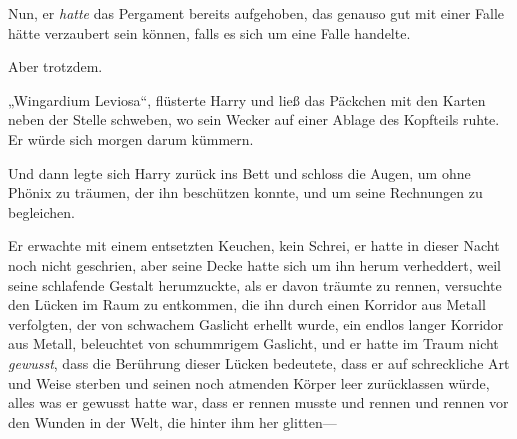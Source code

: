 Nun, er \emph{hatte} das Pergament bereits aufgehoben, das genauso gut mit einer Falle hätte verzaubert sein können, falls es sich um eine Falle handelte.

Aber trotzdem.

„Wingardium Leviosa“, flüsterte Harry und ließ das Päckchen mit den Karten neben der Stelle schweben, wo sein Wecker auf einer Ablage des Kopfteils ruhte. Er würde sich morgen darum kümmern.

Und dann legte sich Harry zurück ins Bett und schloss die Augen, um ohne Phönix zu träumen, der ihn beschützen konnte, und um seine Rechnungen zu begleichen.

\later

Er erwachte mit einem entsetzten Keuchen, kein Schrei, er hatte in dieser Nacht noch nicht geschrien, aber seine Decke hatte sich um ihn herum verheddert, weil seine schlafende Gestalt herumzuckte, als er davon träumte zu rennen, versuchte den Lücken im Raum zu entkommen, die ihn durch einen Korridor aus Metall verfolgten, der von schwachem Gaslicht erhellt wurde, ein endlos langer Korridor aus Metall, beleuchtet von schummrigem Gaslicht, und er hatte im Traum nicht \emph{gewusst}, dass die Berührung dieser Lücken bedeutete, dass er auf schreckliche Art und Weise sterben und seinen noch atmenden Körper leer zurücklassen würde, alles was er gewusst hatte war, dass er rennen musste und rennen und rennen vor den Wunden in der Welt, die hinter ihm her glitten—

